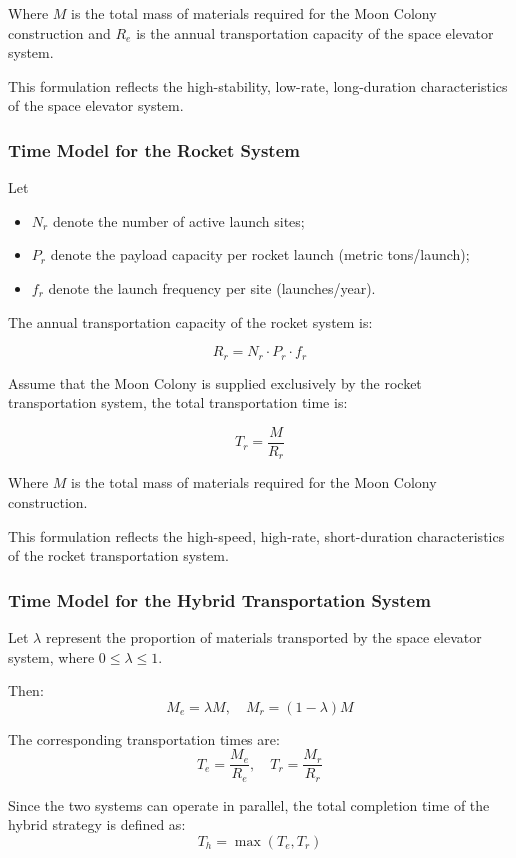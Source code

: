 \documentclass{mcmthesis}
\begin{document}
Where $M$ is the total mass of materials required for the Moon Colony construction and $R_e$ is the annual transportation capacity of the space elevator system.

This formulation reflects the high-stability, low-rate, long-duration characteristics of the space elevator system.

\subsubsection{Time Model for the Rocket System}

Let
\begin{itemize}
    \item $N_r$ denote the number of active launch sites;
    \item $P_r$ denote the payload capacity per rocket launch (metric tons/launch);
    \item $f_r$ denote the launch frequency per site (launches/year).
\end{itemize}

The annual transportation capacity of the rocket system is:

\[R_r=N_r \cdot P_r \cdot f_r\]

Assume that the Moon Colony is supplied exclusively by the rocket transportation system, the total transportation time is:

\[T_r=\frac{M}{R_r}\]

Where $M$ is the total mass of materials required for the Moon Colony construction.

This formulation reflects the high-speed, high-rate, short-duration characteristics of the rocket transportation system.

\subsubsection{Time Model for the Hybrid Transportation System}

Let $\lambda$ represent the proportion of materials transported by the space elevator system, where $0 \leq \lambda \leq 1$.

Then:
\[
    M_e = \lambda M,\quad M_r = (1-\lambda)M
\]

The corresponding transportation times are:
\[
    T_e = \frac{M_e}{R_e},\quad T_r = \frac{M_r}{R_r}
\]

Since the two systems can operate in parallel, the total completion time of the hybrid strategy is defined as:
\[
    T_{h} = \max(T_e, T_r)
\]
\end{document}
